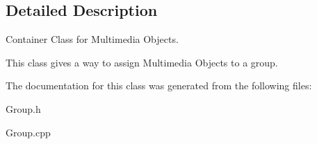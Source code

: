 \subsection{Detailed Description}
Container Class for Multimedia Objects. 

This class gives a way to assign Multimedia Objects to a group. 

The documentation for this class was generated from the following files\+:\begin{DoxyCompactItemize}
\item 
Group.\+h\item 
Group.\+cpp\end{DoxyCompactItemize}
